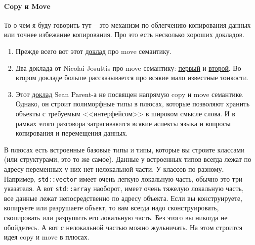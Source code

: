 \documentclass{article}
\begin{document}
\paragraph{Copy и Move}

То о чем я буду говорить тут -- это механизм по облегчению копирования данных или точнее избежание копирования. Про это есть несколько хороших докладов.
\begin{enumerate}
\item Прежде всего вот этот \href{https://www.youtube.com/watch?v=vLinb2fgkHk}{доклад} про move семантику.

\item Два доклада от Nicolai Josuttis про move семантику: \href{https://www.youtube.com/watch?v=PNRju6_yn3o}{первый} и \href{https://www.youtube.com/watch?v=TFMKjL38xAI}{второй}. Во втором докладе больше рассказывается про всякие мало известные тонкости.

\item Этот \href{https://www.youtube.com/watch?v=QGcVXgEVMJg}{доклад} Sean Parent-а не посвящен напрямую copy и move семантике. Однако, он строит полиморфные типы в плюсах, которые позволяют хранить объекты с требуемым <<интерфейсом>> в широком смысле слова. И в рамках этого разговора затрагиваются всякие аспекты языка и вопросы копирования и перемещения данных.
\end{enumerate}


В плюсах есть встроенные базовые типы и типы, которые вы строите классами (или структурами, это то же самое). Данные у встроенных типов всегда лежат по адресу переменных у них нет нелокальной части. У классов по разному. Например, \verb"std::vector" имеет очень легкую локальную часть, обычно это три указателя. А вот \verb"std::array" наоборот, имеет очень тяжелую локальную часть, все данные лежат непосредственно по адресу объекта. Если вы конструируете, копируете или разрушаете объект, то вам всегда надо сконструировать, скопировать или разрушить его локальную часть. Без этого вы никогда не обойдетесь. А вот с  нелокальной частью можно жульничать. На этом строится идея copy и move в плюсах.
\end{document}
